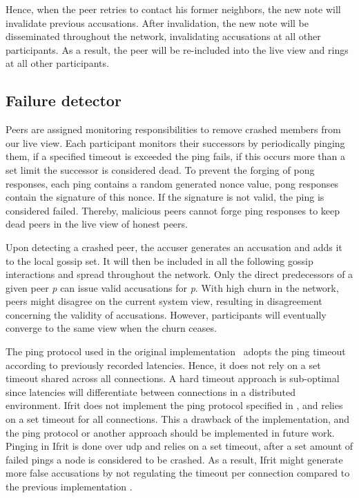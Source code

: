 \documentclass[USenglish]{uit-thesis}
\begin{document}
\begin{code}[h]
\end{code}

Hence, when the peer retries to contact his former neighbors, the new note will invalidate previous accusations.
After invalidation, the new note will be disseminated throughout the network, invalidating accusations at all other participants.
As a result, the peer will be re-included into the live view and rings at all other participants. 

\subsection{Failure detector}
Peers are assigned monitoring responsibilities to remove crashed members from our live view.
Each participant monitors their successors by periodically pinging them, if a specified timeout is exceeded the ping fails, if this occurs more than a set limit the successor is considered dead.
To prevent the forging of pong responses, each ping contains a random generated nonce value, pong responses contain the signature of this nonce.
If the signature is not valid, the ping is considered failed.
Thereby, malicious peers cannot forge ping responses to keep dead peers in the live view of honest peers.

Upon detecting a crashed peer, the accuser generates an accusation and adds it to the local gossip set.
It will then be included in all the following gossip interactions and spread throughout the network.
Only the direct predecessors of a given peer \textit{p} can issue valid accusations for \textit{p}.
With high churn in the network, peers might disagree on the current system view, resulting in disagreement concerning the validity of accusations.
However, participants will eventually converge to the same view when the churn ceases.

The ping protocol used in the original implementation~\cite{flies} adopts the ping timeout according to previously recorded latencies. 
Hence, it does not rely on a set timeout shared across all connections.
A hard timeout approach is sub-optimal since latencies will differentiate between connections in a distributed environment.
Ifrit does not implement the ping protocol specified in \cite{flies}, and relies on a set timeout for all connections.
This a drawback of the implementation, and the ping protocol or another approach should be implemented in future work.
Pinging in Ifrit is done over \gls{udp} and relies on a set timeout, after a set amount of failed pings a node is considered to be crashed.
As a result, Ifrit might generate more false accusations by not regulating the timeout per connection compared to the previous implementation \cite{flies}.
\end{document}
